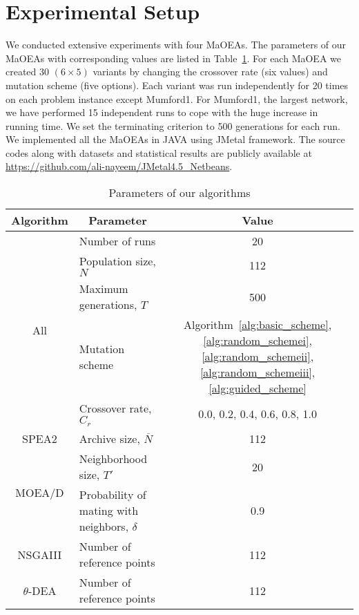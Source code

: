 \section{Experimental Setup} \label{sec:eSetup}
We conducted extensive experiments with four MaOEAs. The parameters of our MaOEAs with corresponding values are listed in Table~\ref{tab:parameters}. For each MaOEA we created 30 $(6 \times 5)$ variants by changing the crossover rate (six values) and mutation scheme (five options). Each variant was run independently for 20 times on each problem instance except Mumford1. For Mumford1, the largest network, we have performed 15 independent runs to cope with the huge increase in running time. We set the terminating criterion to 500 generations for each run. We implemented all the MaOEAs in JAVA using JMetal framework. The source codes along with datasets and statistical results are publicly available at \url{https://github.com/ali-nayeem/JMetal4.5_Netbeans}.


\begin{table}[!htbp]
	\centering
	\caption{Parameters of our algorithms}
	\begin{tabular}{|c|r|c|}
		\hline
		Algorithm & \multicolumn{1}{c|}{Parameter} & Value \\
		\hline
		\multirow{5}[10]{*}{All} & \multicolumn{1}{l|}{Number of runs} & 20 \\
		\cline{2-3}          & \multicolumn{1}{l|}{Population size, $N$} & 112 \\
		\cline{2-3}          & \multicolumn{1}{l|}{Maximum generations, $T$} & 500 \\
		\cline{2-3}          & \multicolumn{1}{l|}{Mutation scheme} & Algorithm~\ref{alg:basic_scheme}, \ref{alg:random_schemei}, \ref{alg:random_schemeii}, \ref{alg:random_schemeiii}, \ref{alg:guided_scheme} \\
		\cline{2-3}          & \multicolumn{1}{l|}{Crossover rate, $C_r$} & 0.0, 0.2, 0.4, 0.6, 0.8, 1.0 \\
		\hline
		SPEA2 & \multicolumn{1}{l|}{Archive size, $\overline{N}$} & 112 \\
		\hline
		\multirow{2}[4]{*}{MOEA/D} & \multicolumn{1}{l|}{Neighborhood size, $T'$} & 20 \\
		\cline{2-3}          & \multicolumn{1}{l|}{Probability of mating with neighbors, $\delta$} & 0.9 \\
		\hline
		NSGAIII & \multicolumn{1}{l|}{Number of reference points} & 112 \\
		\hline
		$\theta$-DEA & \multicolumn{1}{l|}{Number of reference points} & 112 \\
		\hline
	\end{tabular}%
	\label{tab:parameters}%
\end{table}%

